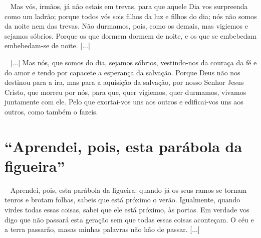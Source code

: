\documentclass[12pt,aspectratio=169]{beamer}
\newcommand{\ver}[1]{%
    \raisebox{0.50ex}{%
        \scalebox{1.1}{%
            \pmb{\textbf{\textcolor{BSpbg}{#1}}}%
        }%
    }%
}
\newcommand{\QUOTE}[1]{%
    \par\noindent\hspace*{0.1\linewidth}%
    \begin{minipage}{0.8\linewidth}%
        \linespread{1.35}\large{#1}%
    \end{minipage}%
}
\newcommand{\WIDEQUOTE}[1]{%
    \par\noindent\hspace*{0.02\linewidth}%
    \begin{minipage}{0.92\linewidth}%
        \linespread{1.25}\large{#1}%
    \end{minipage}%
}
\newcommand{\YEL}[1]{{\textcolor{TXyel}{#1}}}
\newcommand{\GRE}[1]{{\textcolor{TXgre}{#1}}}
\newcommand{\MAG}[1]{{\textcolor{TXmag}{#1}}}
\newcommand{\BRI}[1]{{\textcolor{BSpbg}{#1}}}   %
\begin{document}
    \begin{frame}
        \WIDEQUOTE{%
            \ver{(ARC) 1Ts~5.4--11}~%
            Mas vós, irmãos, já  \YEL{não  estais  em  trevas},  para  que  aquele  Dia  vos
            surpreenda como um ladrão; porque todos vós sois filhos da luz e filhos do  dia;
            nós não somos da noite nem das trevas. \GRE{Não durmamos, pois, como os  demais,
            mas vigiemos e sejamos sóbrios.} Porque os que dormem dormem de noite, e os  que
            se embebedam embebedam-se de noite. [...]
        }
    \end{frame}

    \begin{frame}
        \WIDEQUOTE{%
            \ver{(ARC) 1Ts~5.4--11}~%
            [...] Mas nós, que somos do \YEL{dia}, sejamos  \YEL{sóbrios},  vestindo-nos  da
            couraça da fé e do amor e tendo por capacete a  esperança  da  salvação.  Porque
            Deus \YEL{não nos destinou para a ira}, mas para a \GRE{aquisição da  salvação},
            por nosso Senhor Jesus Cristo, que morreu por nós, para que, quer vigiemos, quer
            durmamos, vivamos juntamente com ele. Pelo que  exortai-vos  uns  aos  outros  e
            edificai-vos uns aos outros, como também o fazeis.
        }
    \end{frame}

\section{``Aprendei, pois, esta parábola da figueira''}

    \begin{frame}
        \QUOTE{%
            \ver{(ARC) Mt~24.32--36}~%
            \MAG{Aprendei}, pois, esta parábola da figueira: \YEL{quando}  \GRE{já  os  seus
            ramos se tornam tenros e brotam folhas}, \YEL{sabeis} \GRE{que  está  próximo  o
            verão}.  \MAG{Igualmente},  \YEL{quando}  \GRE{virdes   todas   essas   coisas},
            \YEL{sabei} que \GRE{ele está próximo, às portas}. Em verdade vos digo  que  não
            passará esta geração sem que todas essas coisas aconteçam. \BRI{O céu e a  terra
            passarão, masas minhas palavras não hão de passar}. [...]
        }
    \end{frame}
\end{document}
